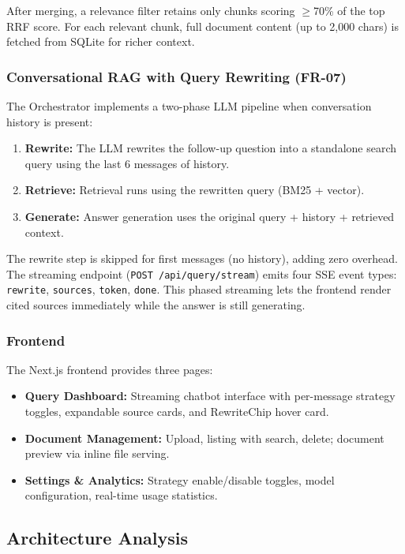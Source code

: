 \documentclass[11pt,a4paper]{article}
\begin{document}
After merging, a relevance filter retains only chunks scoring $\geq$70\% of the top RRF score. For each relevant chunk, full document content (up to 2,000 chars) is fetched from SQLite for richer context.

\subsubsection{Conversational RAG with Query Rewriting (FR-07)}

The Orchestrator implements a two-phase LLM pipeline when conversation history is present:

\begin{enumerate}
    \item \textbf{Rewrite:} The LLM rewrites the follow-up question into a standalone search query using the last 6 messages of history.
    \item \textbf{Retrieve:} Retrieval runs using the rewritten query (BM25 + vector).
    \item \textbf{Generate:} Answer generation uses the original query + history + retrieved context.
\end{enumerate}

The rewrite step is skipped for first messages (no history), adding zero overhead. The streaming endpoint (\texttt{POST /api/query/stream}) emits four SSE event types: \texttt{rewrite}, \texttt{sources}, \texttt{token}, \texttt{done}. This phased streaming lets the frontend render cited sources immediately while the answer is still generating.

\subsubsection{Frontend}

The Next.js frontend provides three pages:
\begin{itemize}
    \item \textbf{Query Dashboard:} Streaming chatbot interface with per-message strategy toggles, expandable source cards, and RewriteChip hover card.
    \item \textbf{Document Management:} Upload, listing with search, delete; document preview via inline file serving.
    \item \textbf{Settings \& Analytics:} Strategy enable/disable toggles, model configuration, real-time usage statistics.
\end{itemize}

\subsection{Architecture Analysis}
\end{document}
